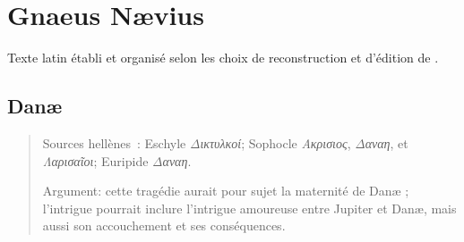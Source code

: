 \documentclass[12pt,onecolumn,twoside,a4paper]{memoir}
\begin{document}
         
         
            \section{Gnaeus Nævius}
            Texte latin établi et organisé selon les choix de reconstruction et d'édition de \cite{SpaltenNaevius}.\par
            
               \subsection*{Danæ}
               \begin{abstract}
                  Sources hellènes : Eschyle \textit{Δικτυλκοί}; Sophocle
                        \textit{Ακρισιος}, \textit{Δαναη},
                     et \textit{Λαρισαῖοι}; Euripide \textit{Δαναη}.\par
                  Argument: cette tragédie aurait pour sujet la maternité de Danæ ; l’intrigue
                     pourrait inclure l’intrigue amoureuse entre Jupiter et Danæ, mais aussi son
                     accouchement et ses conséquences.\par
               \end{abstract}
\end{document}
